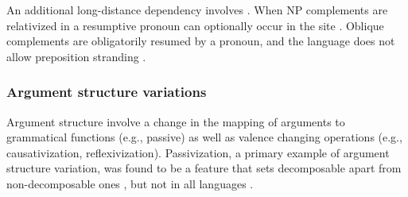 \documentclass[output=paper]{langsci/langscibook}
\begin{document}
An additional long-distance dependency involves . When NP complements are relativized in  a resumptive pronoun can optionally occur in the  site . Oblique complements are obligatorily resumed by a pronoun, and the language does not allow preposition stranding .

\eal
\zl

\subsubsection{Argument structure variations}

Argument structure  involve a change in the mapping of arguments to grammatical functions (e.g., passive) as well as valence changing operations (e.g., causativization, reflexivization). Passivization, a primary example of argument structure variation, was
found to be a feature that sets decomposable  apart from non-decomposable ones
\citep{nunberg94}, but not in all languages \citep{bargmannsailer15}.
\end{document}
